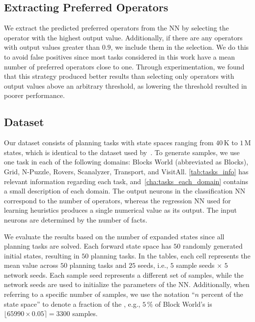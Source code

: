 \documentclass[ppgc,diss,english]{iiufrgs}
\begin{document}
\subsection{Extracting Preferred Operators}
\label{sec:exp-extracting-pos}
We extract the predicted preferred operators from the NN by selecting the operator with the highest output value. Additionally, if there are any operators with output values greater than $0.9$, we include them in the selection. We do this to avoid false positives since most tasks considered in this work have a mean number of preferred operators close to one. Through experimentation, we found that this strategy produced better results than selecting only operators with output values above an arbitrary threshold, as lowering the threshold resulted in poorer performance.

\subsection{Dataset}
\label{sec:exp-dataset}
Our dataset consists of planning tasks with state spaces ranging from $40$\,K to $1$\,M states, which is identical to the dataset used by~\citet{Bettker.etal/2022}. To generate samples, we use one task in each of the following domains: Blocks World (abbreviated as Blocks), Grid, N-Puzzle, Rovers, Scanalyzer, Transport, and VisitAll. \cref{tab:tasks_info} has relevant information regarding each task, and~\vref{cha:tasks_each_domain} contains a small description of each domain. The output neurons in the classification NN correspond to the number of operators, whereas the regression NN used for learning heuristics produces a single numerical value as its output. The input neurons are determined by the number of facts.


We evaluate the results based on the number of expanded states since all planning tasks are solved. Each forward state space \fsp has $50$ randomly generated initial states, resulting in $50$ planning tasks. %
In the tables, each cell represents the mean value across $50$ planning tasks and $25$ seeds, i.e., $5$ sample seeds $\times$ $5$ network seeds. Each sample seed represents a different set of samples, while the network seeds are used to initialize the parameters of the NN.
Additionally, when referring to a specific number of samples, we use the notation ``$n$ percent of the state space'' to denote a fraction of the \fsp, e.g., $5\,\%$ of Block World's \fsp is $\lfloor 65990 \times 0.05 \rceil = 3300$ samples.
\end{document}
